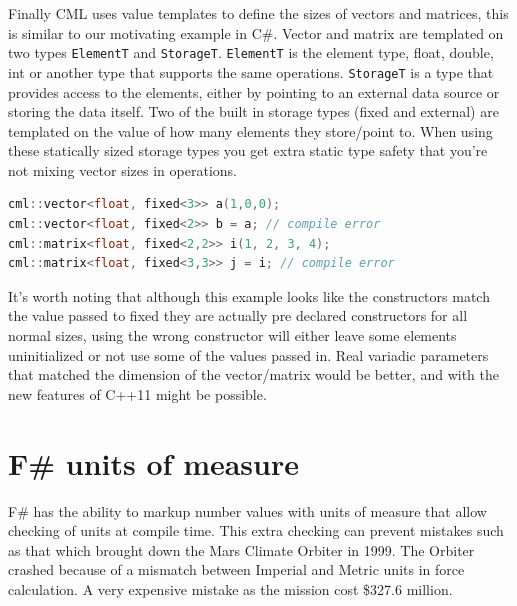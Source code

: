\documentclass[english]{report}
\begin{document}
Finally CML\cite{cmldev} uses value templates to define the sizes
of vectors and matrices, this is similar to our motivating example
in C\#. Vector and matrix are templated on two types \texttt{ElementT}
and \texttt{StorageT}. \texttt{ElementT} is the element type, float,
double, int or another type that supports the same operations. \texttt{StorageT}
is a type that provides access to the elements, either by pointing
to an external data source or storing the data itself. Two of the
built in storage types (fixed and external) are templated on the value
of how many elements they store/point to. When using these statically
sized storage types you get extra static type safety that you're not
mixing vector sizes in operations.

\begin{lstlisting}[keywordstyle={\color{blue}},language={C++}]
cml::vector<float, fixed<3>> a(1,0,0);
cml::vector<float, fixed<2>> b = a; // compile error
cml::matrix<float, fixed<2,2>> i(1, 2, 3, 4);
cml::matrix<float, fixed<3,3>> j = i; // compile error
\end{lstlisting}


It's worth noting that although this example looks like the constructors
match the value passed to fixed they are actually pre declared constructors
for all normal sizes, using the wrong constructor will either leave
some elements uninitialized or not use some of the values passed in.
Real variadic parameters that matched the dimension of the vector/matrix
would be better, and with the new features of C++11 might be possible.



\section{F\# units of measure\label{sec:Fsharp-units}}

F\# has the ability to markup number values with units of measure
that allow checking of units at compile time. This extra checking
can prevent mistakes such as that which brought down the Mars Climate
Orbiter in 1999. The Orbiter crashed because of a mismatch between
Imperial and Metric units in force calculation. A very expensive mistake
as the mission cost \$327.6 million\cite{mars}. 
\end{document}
